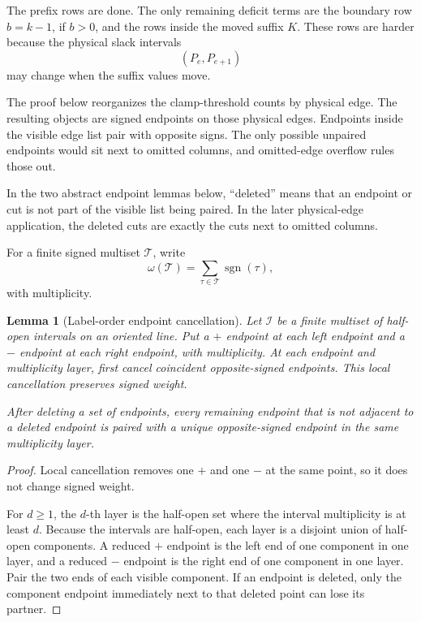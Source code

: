 \documentclass[10pt]{article}
\newtheorem{lemma}{Lemma}
\begin{document}
The prefix rows are done.  The only remaining deficit terms are the boundary
row \(b=k-1\), if \(b>0\), and the rows inside the moved suffix \(K\).  These
rows are harder because the physical slack intervals
\[
  (P_e,P_{e+1})
\]
may change when the suffix values move.

The proof below reorganizes the clamp-threshold counts by physical edge.  The
resulting objects are signed endpoints on those physical edges.  Endpoints
inside the visible edge list pair with opposite signs.  The only possible
unpaired endpoints would sit next to omitted columns, and omitted-edge overflow
rules those out.

In the two abstract endpoint lemmas below, ``deleted'' means that an endpoint
or cut is not part of the visible list being paired.  In the later physical-edge
application, the deleted cuts are exactly the cuts next to omitted columns.

For a finite signed multiset \(\mathcal T\), write
\[
  \omega(\mathcal T)=\sum_{\tau\in\mathcal T}\operatorname{sgn}(\tau),
\]
with multiplicity.

\begin{lemma}[Label-order endpoint cancellation]
Let \(\mathcal I\) be a finite multiset of half-open intervals on an oriented
line.  Put a \(+\) endpoint at each left endpoint and a \(-\) endpoint at each
right endpoint, with multiplicity.  At each endpoint and multiplicity layer,
first cancel coincident opposite-signed endpoints.  This local cancellation
preserves signed weight.

After deleting a set of endpoints, every remaining endpoint that is not
adjacent to a deleted endpoint is paired with a unique opposite-signed endpoint
in the same multiplicity layer.
\end{lemma}

\begin{proof}
Local cancellation removes one \(+\) and one \(-\) at the same point, so it
does not change signed weight.

For \(d\ge1\), the \(d\)-th layer is the half-open set where the interval
multiplicity is at least \(d\).  Because the intervals are half-open, each
layer is a disjoint union of half-open components.  A reduced \(+\) endpoint is
the left end of one component in one layer, and a reduced \(-\) endpoint is the
right end of one component in one layer.  Pair the two ends of each visible
component.  If an endpoint is deleted, only the component endpoint immediately
next to that deleted point can lose its partner.
\end{proof}
\end{document}
